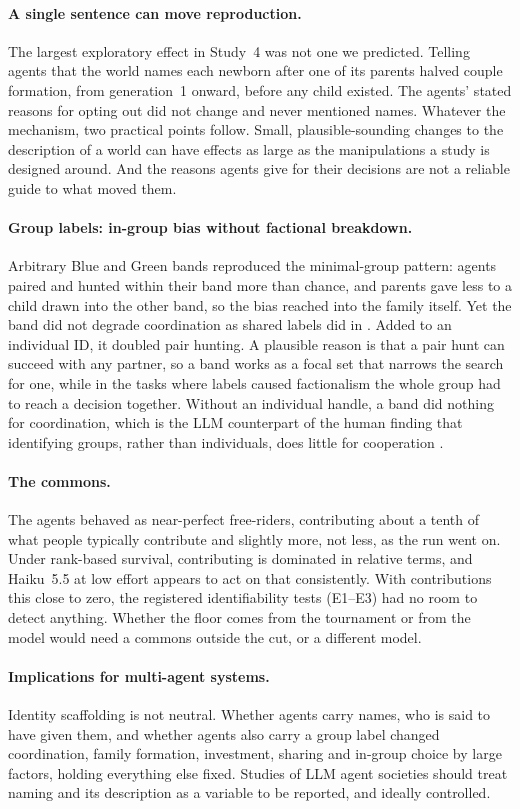 \paragraph{A single sentence can move reproduction.} The largest exploratory effect in Study~4
was not one we predicted. Telling agents that the world names each newborn after one of its
parents halved couple formation, from generation~1 onward, before any child existed. The agents'
stated reasons for opting out did not change and never mentioned names. Whatever the mechanism,
two practical points follow. Small, plausible-sounding changes to the description of a world can
have effects as large as the manipulations a study is designed around. And the reasons agents give
for their decisions are not a reliable guide to what moved them.

\paragraph{Group labels: in-group bias without factional breakdown.} Arbitrary Blue and Green
bands reproduced the minimal-group pattern: agents paired and hunted within their band more than
chance, and parents gave less to a child drawn into the other band, so the bias reached into the
family itself. Yet the band did not degrade coordination as
shared labels did in \citet{delgiudice2026identity}. Added to an individual ID, it doubled pair
hunting. A plausible reason is that a pair hunt can succeed with any partner, so a band works as
a focal set that narrows the search for one, while in the tasks where labels caused factionalism
the whole group had to reach a decision together. Without an individual handle, a band did nothing for
coordination, which is the LLM counterpart of the human finding that identifying groups, rather
than individuals, does little for cooperation \citep{christens2019identification}.

\paragraph{The commons.} The agents behaved as near-perfect free-riders, contributing about a
tenth of what people typically contribute and slightly more, not less, as the run went on. Under
rank-based survival, contributing is dominated in relative terms, and Haiku~5.5 at low effort
appears to act on that consistently. With contributions this close to zero, the registered
identifiability tests (E1--E3) had no room to detect anything. Whether the floor comes from the
tournament or from the model would need a commons outside the cut, or a different model.

\paragraph{Implications for multi-agent systems.} Identity scaffolding is not neutral. Whether
agents carry names, who is said to have given them, and whether agents also carry a group label
changed coordination, family formation, investment, sharing and in-group choice by large factors,
holding everything else fixed. Studies of LLM agent societies should treat naming and its
description as a variable to be reported, and ideally controlled.
